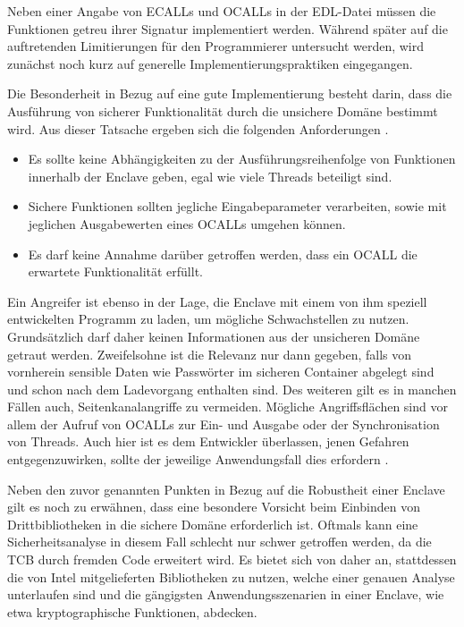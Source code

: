 Neben einer Angabe von ECALLs und OCALLs in der EDL-Datei müssen die Funktionen getreu ihrer Signatur implementiert werden. Während später auf die auftretenden Limitierungen für den Programmierer untersucht werden, wird zunächst noch kurz auf generelle Implementierungspraktiken eingegangen. 

Die Besonderheit in Bezug auf eine gute Implementierung besteht darin, dass die Ausführung von sicherer Funktionalität durch die unsichere Domäne bestimmt wird. Aus dieser Tatsache ergeben sich die folgenden Anforderungen \cite{WinGuide}.

\begin{itemize}
	\item Es sollte keine Abhängigkeiten zu der Ausführungsreihenfolge von Funktionen innerhalb der Enclave geben, egal wie viele Threads beteiligt sind.
	\item Sichere Funktionen sollten jegliche Eingabeparameter verarbeiten, sowie mit jeglichen Ausgabewerten eines OCALLs umgehen können.
	\item Es darf keine Annahme darüber getroffen werden, dass ein OCALL die erwartete Funktionalität erfüllt.
\end{itemize}

Ein Angreifer ist ebenso in der Lage, die Enclave mit einem von ihm speziell entwickelten Programm zu laden, um mögliche Schwachstellen zu nutzen. Grundsätzlich darf daher keinen Informationen aus der unsicheren Domäne getraut werden. Zweifelsohne ist die Relevanz nur dann gegeben, falls von vornherein sensible Daten wie Passwörter im sicheren Container abgelegt sind und schon nach dem Ladevorgang enthalten sind. Des weiteren gilt es in manchen Fällen auch, Seitenkanalangriffe zu vermeiden. Mögliche Angriffsflächen sind vor allem der Aufruf von OCALLs zur Ein- und Ausgabe oder der Synchronisation von Threads. Auch hier ist es dem Entwickler überlassen, jenen Gefahren entgegenzuwirken, sollte der jeweilige Anwendungsfall dies erfordern \cite{M.2016}.

Neben den zuvor genannten Punkten in Bezug auf die Robustheit einer Enclave gilt es noch zu erwähnen, dass eine besondere Vorsicht beim Einbinden von Drittbibliotheken in die sichere Domäne erforderlich ist. Oftmals kann eine Sicherheitsanalyse in diesem Fall schlecht nur schwer getroffen werden, da die TCB durch fremden Code erweitert wird. Es bietet sich von daher an, stattdessen die von Intel mitgelieferten Bibliotheken zu nutzen, welche einer genauen Analyse unterlaufen sind und die gängigsten Anwendungsszenarien in einer Enclave, wie etwa kryptographische Funktionen, abdecken. 
